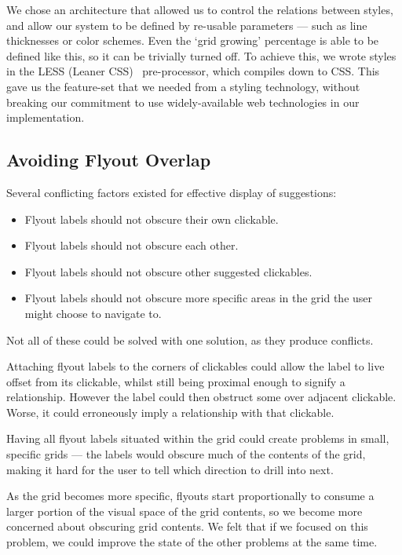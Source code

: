 \documentclass[11pt,openright,a4paper]{report}
\begin{document}
We chose an architecture that allowed us to control the relations between styles, and allow our system to be defined by re-usable parameters --- such as line thicknesses or color schemes. Even the `grid growing' percentage is able to be defined like this, so it can be trivially turned off. To achieve this, we wrote styles in the LESS (Leaner CSS)~\cite{lesscss} pre-processor, which compiles down to CSS. This gave us the feature-set that we needed from a styling technology, without breaking our commitment to use widely-available web technologies in our implementation.

\subsection{Avoiding Flyout Overlap}
\label{sec:avoidance}
Several conflicting factors existed for effective display of suggestions:

\begin{itemize}
\item Flyout labels should not obscure their own clickable.
\item Flyout labels should not obscure each other.
\item Flyout labels should not obscure other suggested clickables.
\item Flyout labels should not obscure more specific areas in the grid the user might choose to navigate to.
\end{itemize}

Not all of these could be solved with one solution, as they produce conflicts.

Attaching flyout labels to the corners of clickables could allow the label to live offset from its clickable, whilst still being proximal enough to signify a relationship. However the label could then obstruct some over adjacent clickable. Worse, it could erroneously imply a relationship with that clickable.

Having all flyout labels situated within the grid could create problems in small, specific grids --- the labels would obscure much of the contents of the grid, making it hard for the user to tell which direction to drill into next.

As the grid becomes more specific, flyouts start proportionally to consume a larger portion of the visual space of the grid contents, so we become more concerned about obscuring grid contents. We felt that if we focused on this problem, we could improve the state of the other problems at the same time.
\end{document}
